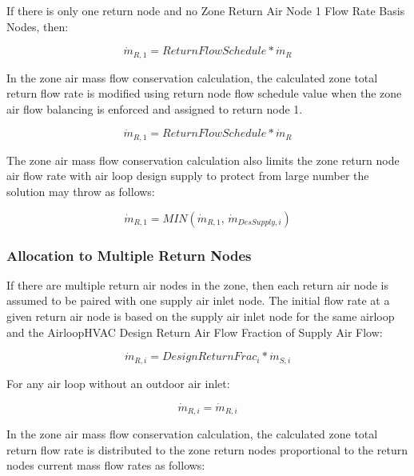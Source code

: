 If there is only one return node and no Zone Return Air Node 1 Flow Rate Basis Nodes, then:

\begin{equation}
{\dot m_{R,1}} = ReturnFlowSchedule*{\dot m_{R}}
\end{equation}

In the zone air mass flow conservation calculation, the calculated zone total return flow rate is modified using return node flow schedule value when the zone air flow balancing is enforced and assigned to return node 1.  

\begin{equation}
{\dot m_{R,1}} = ReturnFlowSchedule*{\dot m_{R}}
\end{equation}

The zone air mass flow conservation calculation also limits the zone return node air flow rate with air loop design supply to protect from large number the solution may throw as follows:

\begin{equation}
{\dot m_{R,1}} = MIN\left( {{\dot m_{R,1}},\,{{\dot m}_{DesSupply,i}}} \right) 
\end{equation} 

\subsubsection{Allocation to Multiple Return Nodes}\label{allocation-to-multiple-return-nodes}

If there are multiple return air nodes in the zone, then each return air node is assumed to be paired with one supply air inlet node. The initial flow rate at a given return air node is based on the supply air inlet node for the same airloop and the AirloopHVAC Design Return Air Flow Fraction of Supply Air Flow:

\begin{equation}
{\dot m_{R,i}} = {DesignReturnFrac_i} * {\dot m_{S,i}}
\end{equation}

For any air loop without an outdoor air inlet:

\begin{equation}
{\dot m_{R,i}} = {\dot m_{R,i}}
\end{equation}

In the zone air mass flow conservation calculation, the calculated zone total return flow rate is distributed to the zone return nodes proportional to the return nodes current mass flow rates as follows:

